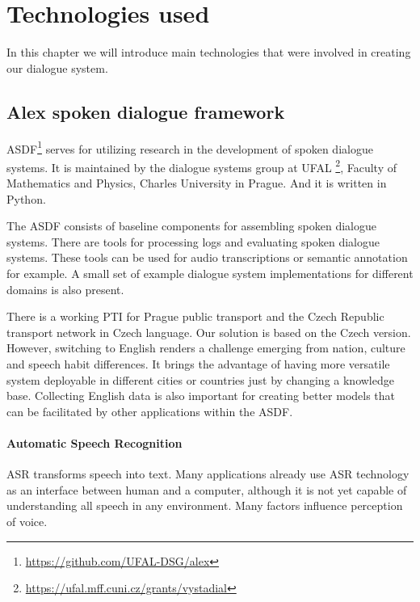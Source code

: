 \chapter{Technologies used}

In this chapter we will introduce main technologies that were involved in creating our dialogue system.

\section{Alex spoken dialogue framework}

\acf{ASDF}\footnote{\url{https://github.com/UFAL-DSG/alex}} serves for utilizing research in the development of spoken dialogue systems.
It is maintained by the dialogue systems group at \acf{UFAL} \footnote{\url{https://ufal.mff.cuni.cz/grants/vystadial}}, Faculty of Mathematics and Physics, Charles University in Prague.
And it is written in Python.

The \ac{ASDF} consists of baseline components for assembling spoken dialogue systems.
There are tools for processing logs and evaluating spoken dialogue systems.
These tools can be used for audio transcriptions or semantic annotation for example.
A small set of example dialogue system implementations for different domains is also present.

There is a working \acf{PTI} \cite{ptics} for Prague public transport and the Czech Republic transport network in Czech language.
Our solution is based on the Czech version.
However, switching to English renders a challenge emerging from nation, culture and speech habit differences.
It brings the advantage of having more versatile system deployable in different cities or countries just by changing a knowledge base.
Collecting English data is also important for creating better models that can be facilitated by other applications within the \ac{ASDF}.


\subsubsection{Automatic Speech Recognition}

\acf{ASR} transforms speech into text.
Many applications already use \ac{ASR} technology as an interface between human and a computer, although it is not yet capable of understanding all speech in any environment.
Many factors influence perception of voice.

